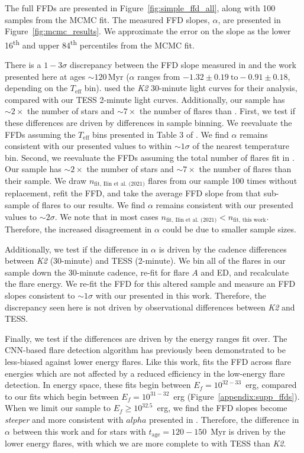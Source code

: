 \documentclass[twocolumn]{aastex631}
\begin{document}
The full FFDs are presented in Figure~\ref{fig:simple_ffd_all}, along with 100 samples from the MCMC fit. The measured
FFD slopes, $\alpha$, are presented in Figure~\ref{fig:mcmc_results}. We approximate the error on the slope as the lower 16\textsuperscript{th} and upper 84\textsuperscript{th}
percentiles from the MCMC fit.


There is a $1-3\sigma$ discrepancy between the FFD slope measured in \cite{ilin21} and the work presented here at ages $\sim 120$\,Myr ($\alpha$ ranges from $-1.32 \pm 0.19 ~\textrm{to} -0.91 \pm 0.18$, depending on the $T_\textrm{eff}$ bin). \cite{ilin21} used the \textit{K2} 30-minute light curves for their analysis, compared with our TESS 2-minute light curves. Additionally, our sample has $\sim 2 \times$ the number of stars and $\sim 7 \times$ the number of flares than \cite{ilin21}. First, we test if these differences are driven by differences in sample binning. We reevaluate the FFDs assuming the $T_\textrm{eff}$ bins presented in Table 3 of \cite{ilin21}. We find $\alpha$ remains consistent with our presented values to within $\sim 1\sigma$ of the nearest temperature bin. Second, we reevaluate the FFDs assuming the total number of flares fit in \cite{ilin21}. Our sample has $\sim 2\times$ the number of stars and $\sim 7\times$ the number of flares than their sample. We draw $n_\textrm{fit, Ilin et al. (2021)}$ \citep[last column in Table 3 of ][]{ilin21} flares from our sample 100 times without replacement, refit the FFD, and take the average FFD slope from that sub-sample of flares to our results.  We find $\alpha$ remains consistent with our presented values to $\sim 2\sigma$. We note that in most cases $n_\textrm{fit, Ilin et al. (2021)} < n_\textrm{fit, this work}$. Therefore, the increased disagreement in $\alpha$ could be due to smaller sample sizes.

Additionally, we test if the difference in $\alpha$ is driven by the cadence differences between \textit{K2} (30-minute) and TESS (2-minute). We bin all of the flares in our sample down the 30-minute cadence, re-fit for flare $A$ and ED, and recalculate the flare energy. We re-fit the FFD for this altered sample and measure an FFD slopes consistent to $\sim 1 \sigma$ with our presented in this work. Therefore, the discrepancy seen here is not driven by observational differences between \textit{K2} and TESS.

Finally, we test if the differences are driven by the energy ranges fit over. The CNN-based flare detection algorithm has previously been demonstrated to be less-biased against lower energy flares. Like this work, \cite{ilin21} fits the FFD across flare energies which are not affected by a reduced efficiency in the low-energy flare detection. In energy space, these fits begin between $E_f = 10^{32-33}$~erg, compared to our fits which begin between $E_f = 10^{31-32}$~erg (Figure~\ref{appendix:supp_ffds}). When we limit our sample to $E_f \geq 10^{32.5}$~erg, we find the FFD slopes become \textit{steeper} and more consistent with $alpha$ presented in \cite{ilin21}. Therefore, the difference in $\alpha$ between this work and \cite{ilin21} for stars with $t_\textrm{age} = 120 - 150$~Myr is driven by the lower energy flares, with which we are more complete to with TESS than \textit{K2}.
\end{document}
